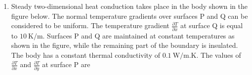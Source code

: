 \documentclass[journal]{IEEEtran}
\numberwithin{equation}{enumi}
\numberwithin{figure}{enumi}
\begin{document}
\begin{enumerate}
\begin{enumerate}
\end{enumerate}
\item Steady two-dimensional heat conduction takes place in the body shown in the figure below. The normal temperature gradients over surfaces P and Q can be considered to be uniform. The temperature gradient $\frac{\partial T}{\partial x}$ at surface Q is equal to $10 \ \text{K/m}$. Surfaces P and Q are maintained at constant temperatures as shown in the figure, while the remaining part of the boundary is insulated. The body has a constant thermal conductivity of $0.1 \ \text{W/m.K}$. The values of $\frac{\partial T}{\partial x}$ and $\frac{\partial T}{\partial y}$ at surface P are






\end{enumerate}
\end{document}
